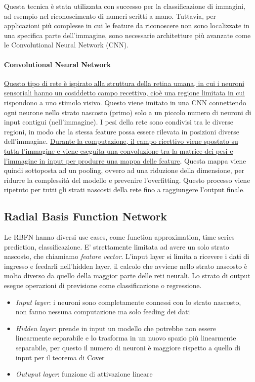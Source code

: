 Questa tecnica è stata utilizzata con successo per la classificazione di immagini, ad esempio nel riconoscimento di numeri scritti a mano. Tuttavia, per applicazioni più complesse in cui le feature da riconoscere non sono localizzate in una specifica parte dell'immagine, sono necessarie architetture più avanzate come le Convolutional Neural Network (CNN).

\paragraph{Convolutional Neural Network}
\uline{Questo tipo di rete è ispirato alla struttura della retina umana, in cui i neuroni sensoriali hanno un cosiddetto campo recettivo, cioè una regione limitata in cui rispondono a uno stimolo visivo}. Questo viene imitato in una CNN connettendo ogni neurone nello strato nascosto (primo) solo a un piccolo numero di neuroni di input contigui (nell'immagine). I pesi della rete sono condivisi tra le diverse regioni, in modo che la stessa feature possa essere rilevata in posizioni diverse dell'immagine. \uline{Durante la computazione, il campo ricettivo viene spostato su tutta l'immagine e viene eseguita una convoluzione tra la matrice dei pesi e l'immagine in input per produrre una mappa delle feature}. Questa mappa viene quindi sottoposta ad un pooling, ovvero ad una riduzione della dimensione, per ridurre la complessità del modello e prevenire l'overfitting. Questo processo viene ripetuto per tutti gli strati nascosti della rete fino a raggiungere l'output finale.

\subsection{Radial Basis Function Network}
Le RBFN hanno diversi use cases, come function approximation, time series prediction, classificazione. E' strettamente limitata ad avere un solo strato nascosto, che chiamiamo \textit{feature vector}. L'input layer si limita a ricevere i dati di ingresso e feedarli nell'hidden layer, il calcolo che avviene nello strato nascosto è molto diverso da quello della maggior parte delle reti neurali. Lo strato di output esegue operazioni di previsione come classificazione o regressione.

\begin{itemize}
    \item \textit{Input layer}: i neuroni sono completamente connessi con lo strato nascosto, non fanno nessuna computazione ma solo feeding dei dati
    \item \textit{Hidden layer}: prende in input un modello che potrebbe non essere linearmente separabile e lo trasforma in un nuovo spazio più linearmente separabile, per questo il numero di neuroni è maggiore rispetto a quello di input per il teorema di Cover
    \item \textit{Outuput layer}: funzione di attivazione lineare
\end{itemize}

